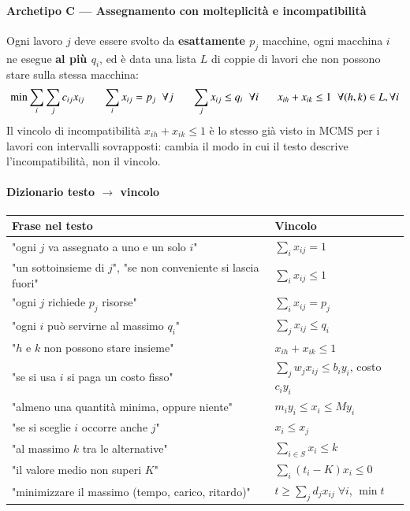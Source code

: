 \documentclass[12pt]{extarticle} %
\begin{document}
\paragraph{Archetipo C --- Assegnamento con molteplicità e incompatibilità}
Ogni lavoro $j$ deve essere svolto da \textbf{esattamente $p_j$} macchine, ogni macchina $i$ ne esegue \textbf{al più $q_i$}, ed è data una lista $L$ di coppie di lavori che non possono stare sulla stessa macchina:
\[
\min \sum_i \sum_j c_{ij}x_{ij}
\hspace{0.6cm}
\sum_i x_{ij} = p_j \;\; \forall j
\hspace{0.6cm}
\sum_j x_{ij} \le q_i \;\; \forall i
\hspace{0.6cm}
x_{ih} + x_{ik} \le 1 \;\; \forall (h,k)\in L, \forall i
\]
Il vincolo di incompatibilità $x_{ih}+x_{ik}\le 1$ è lo stesso già visto in MCMS per i lavori con intervalli sovrapposti: cambia il modo in cui il testo descrive l'incompatibilità, non il vincolo.

\paragraph{Dizionario testo $\to$ vincolo}
\begin{center}
\begin{tabular}{ll}
\hline
\textbf{Frase nel testo} & \textbf{Vincolo} \\
\hline
"ogni $j$ va assegnato a uno e un solo $i$" & $\sum_i x_{ij} = 1$ \\
"un sottoinsieme di $j$", "se non conveniente si lascia fuori" & $\sum_i x_{ij} \le 1$ \\
"ogni $j$ richiede $p_j$ risorse" & $\sum_i x_{ij} = p_j$ \\
"ogni $i$ può servirne al massimo $q_i$" & $\sum_j x_{ij} \le q_i$ \\
"$h$ e $k$ non possono stare insieme" & $x_{ih} + x_{ik} \le 1$ \\
"se si usa $i$ si paga un costo fisso" & $\sum_j w_j x_{ij} \le b_i y_i$, costo $c_iy_i$ \\
"almeno una quantità minima, oppure niente" & $m_i y_i \le x_i \le M y_i$ \\
"se si sceglie $i$ occorre anche $j$" & $x_i \le x_j$ \\
"al massimo $k$ tra le alternative" & $\sum_{i \in S} x_i \le k$ \\
"il valore medio non superi $K$" & $\sum_i (t_i - K)x_i \le 0$ \\
"minimizzare il massimo (tempo, carico, ritardo)" & $t \ge \sum_j d_j x_{ij}\;\forall i$, $\min t$ \\
\hline
\end{tabular}
\end{center}
\end{document}

